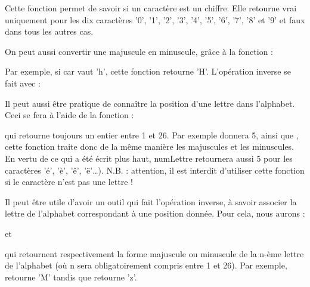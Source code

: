	Cette fonction permet de savoir si un caractère est un chiffre. 
	Elle retourne vrai uniquement pour les dix caractères 
	'0', '1', '2', '3', '4', '5', '6', '7', '8' et '9' 
	et faux dans tous les autres cas.

	On peut aussi convertir une majuscule en minuscule, grâce à la fonction :

	\begin{center}
	\end{center}

	Par exemple, si car vaut 'h', 
	cette fonction retourne 'H'. 
	L'opération inverse se fait avec :

	\begin{center}
	\end{center}

	Il peut aussi être pratique de connaître 
	la position d'une lettre dans l'alphabet. 
	Ceci se fera à l'aide de la fonction :

	\begin{center}
	\end{center}

	qui retourne toujours un entier entre 1 et 26. 
	Par exemple  donnera 5, 
	ainsi que , 
	cette fonction traite donc de la même manière 
	les majuscules et les minuscules. 
	En vertu de ce qui a été écrit plus haut, 
	numLettre retournera aussi 5 pour les caractères 'é', 'è', 'ê', 'ë'\dots). 
	N.B. :  attention, il est interdit d'utiliser cette fonction 
	si le caractère n'est pas une lettre !

	Il peut être utile d'avoir un outil qui fait l'opération inverse, 
	à savoir associer la lettre de l'alphabet correspondant à une position donnée. 
	Pour cela, nous aurons : 

	\begin{center}
	\end{center}
	
	et

	\begin{center}
	\end{center}

	qui retournent respectivement 
	la forme majuscule ou minuscule de la n-ème lettre de l'alphabet 
	(où n sera obligatoirement compris entre 1 et 26). 
	Par exemple,  retourne 'M' 
	tandis que  retourne 'z'.

